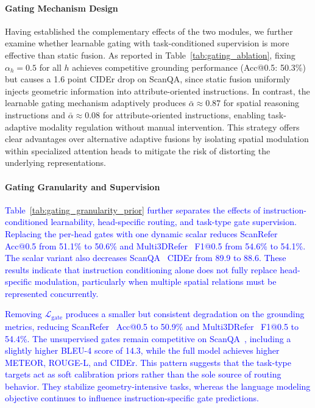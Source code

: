 \documentclass[lettersize,journal]{IEEEtran}
\begin{document}
\paragraph*{Gating Mechanism Design}
\label{sec:igga_ablation}
Having established the complementary effects of the two modules, we further examine whether learnable gating with task-conditioned supervision is more effective than static fusion. As reported in Table~\ref{tab:gating_ablation}, fixing $\alpha_h = 0.5$ for all $h$ achieves competitive grounding performance (Acc@0.5: 50.3\%) but causes a 1.6 point CIDEr drop on ScanQA, since static fusion uniformly injects geometric information into attribute-oriented instructions. In contrast, the learnable gating mechanism adaptively produces $\bar{\alpha} \approx 0.87$ for spatial reasoning instructions and $\bar{\alpha} \approx 0.08$ for attribute-oriented instructions, enabling task-adaptive modality regulation without manual intervention. This strategy offers clear advantages over alternative adaptive fusions by isolating spatial modulation within specialized attention heads to mitigate the risk of distorting the underlying representations.

\paragraph*{Gating Granularity and Supervision}
\textcolor{blue}{Table~\ref{tab:gating_granularity_prior} further separates the effects of instruction-conditioned learnability, head-specific routing, and task-type gate supervision. Replacing the per-head gates with one dynamic scalar reduces ScanRefer~\cite{scanrefer2020} Acc@0.5 from 51.1\% to 50.6\% and Multi3DRefer~\cite{multi3drefer2023} F1@0.5 from 54.6\% to 54.1\%. The scalar variant also decreases ScanQA~\cite{scanqa2022} CIDEr from 89.9 to 88.6. These results indicate that instruction conditioning alone does not fully replace head-specific modulation, particularly when multiple spatial relations must be represented concurrently.}

\textcolor{blue}{Removing $\mathcal{L}_{\mathrm{gate}}$ produces a smaller but consistent degradation on the grounding metrics, reducing ScanRefer~\cite{scanrefer2020} Acc@0.5 to 50.9\% and Multi3DRefer~\cite{multi3drefer2023} F1@0.5 to 54.4\%. The unsupervised gates remain competitive on ScanQA~\cite{scanqa2022}, including a slightly higher BLEU-4 score of 14.3, while the full model achieves higher METEOR, ROUGE-L, and CIDEr. This pattern suggests that the task-type targets act as soft calibration priors rather than the sole source of routing behavior. They stabilize geometry-intensive tasks, whereas the language modeling objective continues to influence instruction-specific gate predictions.}
\end{document}
